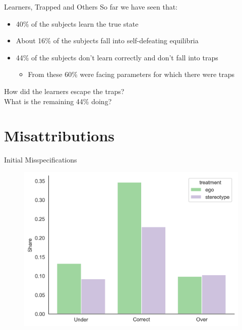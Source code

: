 \documentclass[aspectratio=169]{beamer}
\begin{document}
\begin{frame}{Learners, Trapped and Others}
    So far we have seen that:\\
    \begin{itemize}
        \item 40\% of the subjects learn the true state
        \item About 16\% of the subjects fall into self-defeating equilibria
        \item 44\% of the subjects don't learn correctly and don't fall into traps
        \begin{itemize}
            \item From these 60\% were facing parameters for which there were traps
        \end{itemize}
    \end{itemize}
    \bigskip
    How did the learners escape the traps?\\
    \bigskip
    What is the remaining 44\% doing?\\

\end{frame}

\section*{Misattributions}

\begin{frame}{Initial Misspecifications}
    \label{initialhist}
    \begin{figure}
        \centering
        \includegraphics[scale=.6]{misspecification_hist.png}
    \end{figure}

\end{frame}
\end{document}
